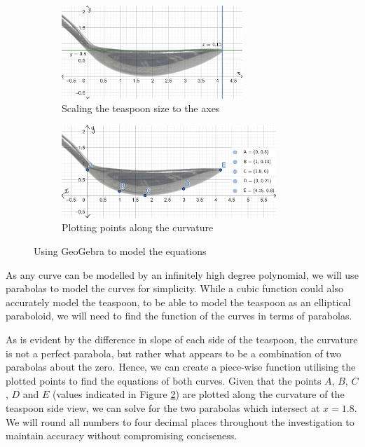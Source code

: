 \documentclass[12pt]{article}
\begin{document}
\begin{figure}[h]
     \centering
     \begin{subfigure}[b]{0.45\textwidth}
         \centering
         \includegraphics[width=0.75\textwidth]{images/tsp bound.jpg}
         \caption{Scaling the teaspoon size to the axes}
         \label{fig:scale1}
     \end{subfigure}
     \hfill
     \begin{subfigure}[b]{0.45\textwidth}
         \centering
         \includegraphics[width=0.89\textwidth]{images/tsp with points.jpg}
         \caption{Plotting points along the curvature}
         \label{fig:plot1}
     \end{subfigure}
     \hfill
        \caption{Using GeoGebra to model the equations}
        \label{fig:tsp geo1}
\end{figure}

As any curve can be modelled by an infinitely high degree polynomial, we will use parabolas to model the curves for simplicity. While a cubic function could also accurately model the teaspoon, to be able to model the teaspoon as an elliptical paraboloid, we will need to find the function of the curves in terms of parabolas.

As is evident by the difference in slope of each side of the teaspoon, the curvature is not a perfect parabola, but rather what appears to be a combination of two parabolas about the zero. Hence, we can create a piece-wise function utilising the plotted points to find the equations of both curves. 
Given that the points $A$, $B$, $C$, $D$ and $E$ (values indicated in Figure \ref{fig:plot1}) are plotted along the curvature of the teaspoon side view, we can solve for the two parabolas which intersect at $x=1.8$. We will round all numbers to four decimal places throughout the investigation to maintain accuracy without compromising conciseness.
\end{document}
